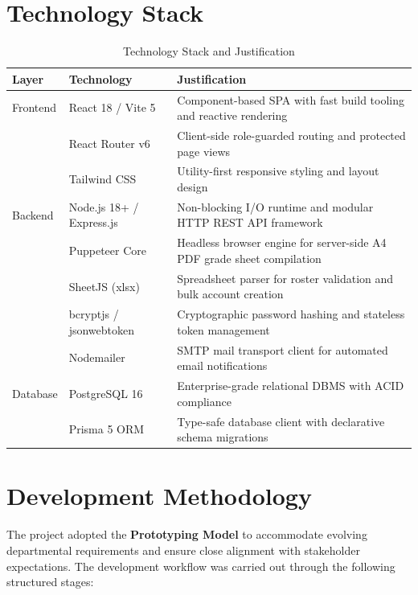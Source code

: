 \documentclass[12pt,a4paper]{report}
\begin{document}
\section{Technology Stack}
\begin{table}[H]
\centering
\caption{Technology Stack and Justification}
\label{tab:tech_stack}
\vspace{4pt}
\small
\begin{tabularx}{\textwidth}{@{}l p{4.2cm} X@{}}
\toprule
\textbf{Layer} & \textbf{Technology} & \textbf{Justification} \\
\midrule
Frontend       & React 18 / Vite 5       & Component-based SPA with fast build tooling and reactive rendering \\
               & React Router v6         & Client-side role-guarded routing and protected page views \\
               & Tailwind CSS            & Utility-first responsive styling and layout design \\
\midrule
Backend        & Node.js 18+ / Express.js & Non-blocking I/O runtime and modular HTTP REST API framework \\
               & Puppeteer Core          & Headless browser engine for server-side A4 PDF grade sheet compilation \\
               & SheetJS (xlsx)          & Spreadsheet parser for roster validation and bulk account creation \\
               & bcryptjs / jsonwebtoken & Cryptographic password hashing and stateless token management \\
               & Nodemailer              & SMTP mail transport client for automated email notifications \\
\midrule
Database       & PostgreSQL 16           & Enterprise-grade relational DBMS with ACID compliance \\
               & Prisma 5 ORM            & Type-safe database client with declarative schema migrations \\
\bottomrule
\end{tabularx}
\end{table}

\section{Development Methodology}
The project adopted the \textbf{Prototyping Model} to accommodate evolving departmental requirements and ensure close alignment with stakeholder expectations. The development workflow was carried out through the following structured stages:
\end{document}
